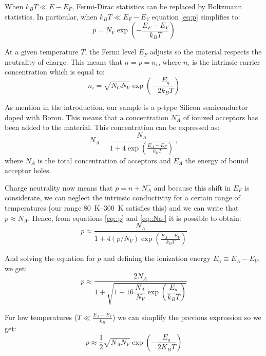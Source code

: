 \documentclass[11pt,a4paper]{article}
\begin{document}
When $k_BT\ll E-E_F$, Fermi-Dirac statistics can be replaced by Boltzmann statistics. In particular, when $k_BT\ll E_F-E_V$ equation \eqref{eq:p} simplifies to:
\begin{equation}\label{eq::p}
p=N_V\exp\left(-\frac{E_F-E_V}{k_BT}\right)
\end{equation}

At a given temperature $T$, the Fermi level $E_F$ adjusts so the material respects the neutrality of charge. This means that $n=p=n_i$, where $n_i$ is the intrinsic carrier concentration which is equal to:
\begin{equation}\label{eq:ni}
n_i=\sqrt{N_CN_V}\exp\left(-\frac{E_g}{2k_BT}\right)
\end{equation}

As mention in the introduction, our sample is a p-type Silicon semiconductor doped with Boron. This means that a concentration $N_A^-$ of ionized acceptors has been added to the material. This concentration can be expressed as:
\begin{equation}\label{eq::Na-}
N_A^-=\frac{N_A}{1+4\exp\left(\frac{E_A-E_F}{k_BT}\right)}\,,
\end{equation}
where $N_A$ is the total concentration of acceptors and $E_A$ the energy of bound acceptor holes.

Charge neutrality now means that $p=n+N_A^-$ and because this shift in $E_F$ is considerate, we can neglect the intrinsic conductivity for a certain range of temperatures (our range \SIrange{80}{300}{\kelvin} satisfies this) and we can write that $p\approx N_A^-$. Hence, from equations \eqref{eq::p} and \eqref{eq::Na-} it is possible to obtain:
\begin{equation*}
p\approx\frac{N_A}{1+4(p/N_V)\exp\left(\frac{E_A-E_V}{k_BT}\right)}
\end{equation*}

And solving the equation for $p$ and defining the ionization energy $E_a\equiv E_A-E_V$, we get:
\begin{equation}\label{eq:p_final}
p\approx\frac{2N_A}{1+\sqrt{1+16\,\dfrac{N_A}{N_V}\exp\left(\dfrac{E_a}{k_BT}\right)}}
\end{equation}

For low temperatures ($T\ll\frac{E_A-E_V}{k_B}$) we can simplify the previous expression so we get:
\begin{equation}\label{eq:p_final_approx}
p\approx \frac{1}{2}\sqrt{N_AN_V}\exp\left(-\frac{E_a}{2K_BT}\right)
\end{equation}
\end{document}
